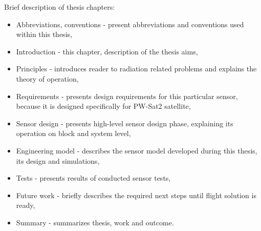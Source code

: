     Brief description of thesis chapters:
    \begin{itemize}
        \item Abbreviations, conventions - present abbreviations and conventions used within this thesis,
        \item Introduction - this chapter, description of the thesis aims,
        \item Principles - introduces reader to radiation related problems and explains the theory of operation,
        \item Requirements - presents design requirements for this particular sensor, because it is designed specifically for PW-Sat2 satellite,
        \item Sensor design - presents high-level sensor design phase, explaining its operation on block and system level,
        \item Engineering model - describes the sensor model developed during this thesis, its design and simulations,
        \item Tests - presents results of conducted sensor tests,
        \item Future work - briefly describes the required next steps until flight solution is ready,
        \item Summary - summarizes thesis, work and outcome.
    \end{itemize}
